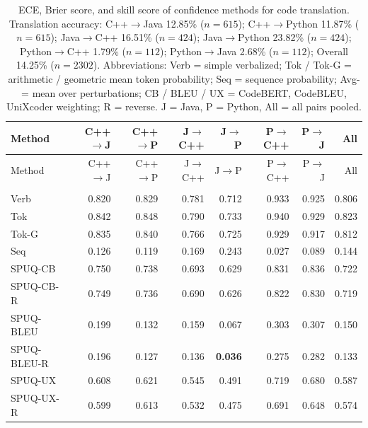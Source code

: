 {\scriptsize
\setlength{\tabcolsep}{2.5pt}
\renewcommand{\arraystretch}{0.95}
\begin{longtable}{@{}lrrrrrrr@{}}
\caption{ECE, Brier score, and skill score of confidence methods for code translation. Translation accuracy: C++$\rightarrow$Java 12.85\% ($n=615$); C++$\rightarrow$Python 11.87\% ($n=615$); Java$\rightarrow$C++ 16.51\% ($n=424$); Java$\rightarrow$Python 23.82\% ($n=424$); Python$\rightarrow$C++ 1.79\% ($n=112$); Python$\rightarrow$Java 2.68\% ($n=112$); Overall 14.25\% ($n=2302$). Abbreviations: Verb = simple verbalized; Tok / Tok-G = arithmetic / geometric mean token probability; Seq = sequence probability; Avg- = mean over perturbations; CB / BLEU / UX = CodeBERT, CodeBLEU, UniXcoder weighting; R = reverse. J = Java, P = Python, All = all pairs pooled.\label{tab:translation-calibration}}\\
\toprule
Method & C++$\to$J & C++$\to$P & J$\to$C++ & J$\to$P & P$\to$C++ & P$\to$J & All \\
\midrule
\endfirsthead
\toprule
Method & C++$\to$J & C++$\to$P & J$\to$C++ & J$\to$P & P$\to$C++ & P$\to$J & All \\
\midrule
\endhead
\bottomrule
\endfoot
\multicolumn{8}{l}{\textit{ECE (10 bins, lower is better)}} \\
\midrule
Verb & 0.820 & 0.829 & 0.781 & 0.712 & 0.933 & 0.925 & 0.806 \\
\addlinespace
Tok & 0.842 & 0.848 & 0.790 & 0.733 & 0.940 & 0.929 & 0.823 \\
Tok-G & 0.835 & 0.840 & 0.766 & 0.725 & 0.929 & 0.917 & 0.812 \\
\addlinespace
Seq & 0.126 & 0.119 & 0.169 & 0.243 & 0.027 & 0.089 & 0.144 \\
\addlinespace
SPUQ-CB & 0.750 & 0.738 & 0.693 & 0.629 & 0.831 & 0.836 & 0.722 \\
SPUQ-CB-R & 0.749 & 0.736 & 0.690 & 0.626 & 0.822 & 0.830 & 0.719 \\
SPUQ-BLEU & 0.199 & 0.132 & 0.159 & 0.067 & 0.303 & 0.307 & 0.150 \\
SPUQ-BLEU-R & 0.196 & 0.127 & 0.136 & \textbf{0.036} & 0.275 & 0.282 & 0.133 \\
SPUQ-UX & 0.608 & 0.621 & 0.545 & 0.491 & 0.719 & 0.680 & 0.587 \\
SPUQ-UX-R & 0.599 & 0.613 & 0.532 & 0.475 & 0.691 & 0.648 & 0.574 \\

\end{longtable}}
